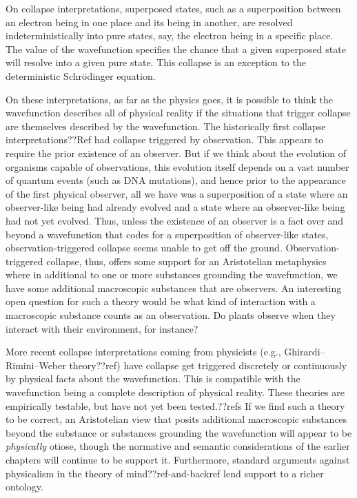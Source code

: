 On collapse interpretations, superposed states, such as a superposition between an electron being in one place and its 
being in another, are resolved indeterministically into pure states, say, the electron being in a specific place. The 
value of the wavefunction specifies the chance that a given superposed state will resolve into a given pure state. 
This collapse is an exception to the deterministic Schr\"{o}dinger equation.

On these interpretations, as far as the physics goes, it is possible to think the wavefunction describes all of physical 
reality if the situations that trigger collapse are themselves described by the wavefunction. The historically first collapse interpretations??Ref had collapse triggered by observation. This appears to require the prior existence of an observer. But if we think about 
the evolution of organisms capable of observations, this evolution itself depends on a vast number of quantum events (such 
as DNA mutations), and hence prior to the appearance of the first physical observer, all we have was a superposition 
of a state where an observer-like being had already evolved and a state where an observer-like being had not yet evolved. 
Thus, unless the existence of an observer is a fact over and beyond a wavefunction that codes for a superposition of 
observer-like states, observation-triggered collapse seems unable to get off the ground. Observation-triggered collapse,
thus, offers some support for an Aristotelian metaphysics where in additional to one or more substances grounding the 
wavefunction, we have some additional macroscopic substances that are observers. An interesting open question for such a theory 
would be what kind of interaction with a macroscopic substance counts as an observation. Do plants observe when they interact
with their environment, for instance? 

More recent collapse interpretations coming from physicists (e.g., Ghirardi–Rimini–Weber theory??ref) have collapse get triggered discretely or continuously by physical facts about the wavefunction. This is compatible with the wavefunction being a 
complete description of physical reality. These theories are empirically testable, but have not yet been 
tested.??refs If we find such a theory to be correct, an Aristotelian view that posits additional macroscopic substances 
beyond the substance or substances grounding the wavefunction will appear to be \textit{physically} otiose, though the
normative and semantic considerations of the earlier chapters will continue to be support it. Furthermore, standard 
arguments against physicalism in the theory of mind??ref-and-backref lend support to a richer ontology.


